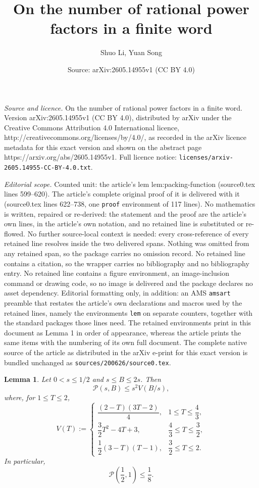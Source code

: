 \documentclass[10pt,a4paper]{amsart}
\title{On the number of rational power factors in a finite word}
\author{Shuo Li, Yuan Song}
\date{Source: arXiv:2605.14955v1 (CC BY 4.0)}
\newtheorem{lem}{Lemma}
\begin{document}
\maketitle

\noindent\emph{Source and licence.} On the number of rational power factors in a finite word. Version arXiv:2605.14955v1 (CC BY 4.0), distributed by arXiv under the Creative Commons Attribution 4.0 International licence, http://creativecommons.org/licenses/by/4.0/, as recorded in the arXiv licence metadata for this exact version and shown on the abstract page https://arxiv.org/abs/2605.14955v1. Full licence notice: \texttt{licenses/arxiv-2605.14955-CC-BY-4.0.txt}.\par\smallskip

\noindent\textit{Editorial scope.} Counted unit: the article's lem lem:packing-function (source0.tex lines 599--620). The article's complete original proof of it is delivered with it (source0.tex lines 622--738, one \texttt{proof} environment of 117 lines). No mathematics is written, repaired or re-derived: the statement and the proof are the article's own lines, in the article's own notation, and no retained line is substituted or re-flowed.  No further source-local context is needed: every cross-reference of every retained line resolves inside the two delivered spans.  Nothing was omitted from any retained span, so the package carries no omission record.  No retained line contains a citation, so the wrapper carries no bibliography and no bibliography entry.  No retained line contains a figure environment, an image-inclusion command or drawing code, so no image is delivered and the package declares no asset dependency.  Editorial formatting only, in addition: an AMS \texttt{amsart} preamble that restates the article's own declarations and macros used by the retained lines, namely the environments \texttt{lem} on separate counters, together with the standard packages those lines need.  The retained environments print in this document as Lemma 1 in order of appearance, whereas the article prints the same items with the numbering of its own full document.  The complete native source of the article as distributed in the arXiv e-print for this exact version is bundled unchanged as \texttt{sources/200626/source0.tex}.
\begin{lem}\label{lem:packing-function}
Let \(0<s\le 1/2\) and \(s\le B\le 2s\). Then
\[
\mathcal P(s,B)\le s^2V(B/s),
\]
where, for \(1\le T\le 2\),
\[
V(T):=
\begin{cases}
\dfrac{(2-T)(3T-2)}{4},
& 1\le T\le \dfrac43,\\[8pt]
\dfrac32T^2-4T+3,
& \dfrac43\le T\le \dfrac32,\\[8pt]
\dfrac12(3-T)(T-1),
& \dfrac32\le T\le 2.
\end{cases}
\]
In particular,
\[
\mathcal P\left(\frac12,1\right)\le \frac18.
\]
\end{lem}
\end{document}
